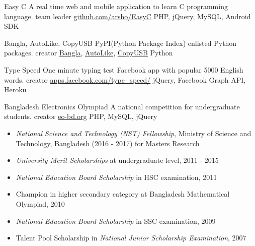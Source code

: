 \documentclass[10pt,a4paper]{altacv}
\begin{document}
\cvproject
{Easy C}
{A real time web and mobile application to learn C programming language.}
{team leader}
{\href{https://github.com/arsho/EasyC/}{github.com/arsho/EasyC}}
{PHP, jQuery, MySQL, Android SDK}
\divider

\cvproject
{Bangla, AutoLike, CopyUSB}
{PyPI(Python Package Index) enlisted Python packages.}
{creator}
{\href{https://pypi.python.org/pypi/bangla/}{Bangla}, \href{https://pypi.python.org/pypi/autolike/}{AutoLike}, \href{https://pypi.python.org/pypi/copyusb/}{CopyUSB}}
{Python}
\divider

\cvproject
{Type Speed}
{One minute typing test Facebook app with popular 5000 English words.}
{creator}
{\href{https://apps.facebook.com/type_speed/}{apps.facebook.com/type\_speed/}}
{jQuery, Facebook Graph API, Heroku}
\divider

\cvproject 
{Bangladesh Electronics Olympiad}
{A national competition for undergraduate students.}
{creator}
{\href{http://www.eo-bd.org/}{eo-bd.org}}
{PHP, MySQL, jQuery}




\clearpage

\begin{itemize}

\item \emph{National Science and Technology (NST) Fellowship}, Ministry of Science and Technology, Bangladesh (2016 - 2017) for Masters Research

\divider

\item \emph{University Merit Scholarships} at undergraduate level, 2011 - 2015

\divider

\item \emph{National Education Board Scholarship} in HSC examination, 2011

\divider

\item Champion in higher secondary category at Bangladesh Mathematical Olympiad, 2010

\divider

\item \emph{National Education Board Scholarship} in SSC examination, 2009

\divider

\item Talent Pool Scholarship in \emph{National Junior Scholarship Examination}, 2007

\end{itemize}
\end{document}
